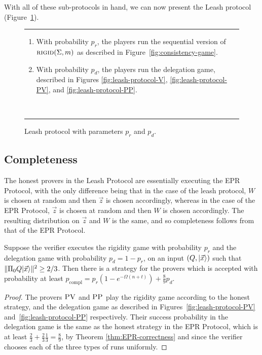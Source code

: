 With all of these sub-protocols in hand, we can now present the Leash protocol (Figure~\ref{fig:leash-description}).
\begin{figure}[H]
\rule[1ex]{\textwidth}{0.5pt}
\vspace{-25pt}
\justify 
\begin{enumerate}
\item With probability $p_r$, the players run the sequential version of $\textsc{rigid}(\Sigma,m)$ as described in Figure~\ref{fig:consistency-game}.
\item With probability $p_d$, the players run the delegation game, described in Figures \ref{fig:leash-protocol-V}, \ref{fig:leash-protocol-PV}, and \ref{fig:leash-protocol-PP}.
\end{enumerate}
~\\
\rule[2ex]{\textwidth}{0.5pt}\vspace{-.5cm}
\caption{Leash protocol with parameters $p_r$ and $p_d$.}
\label{fig:leash-description}
\end{figure} 

\subsection{Completeness}

The honest provers in the Leash Protocol are essentially executing the EPR Protocol, with the only difference being that in the case of the leash protocol, $W$ is chosen at random and then $\vec{z}$ is chosen accordingly, whereas in the case of the EPR Protocol, $\vec{z}$ is chosen at random and then $W$ is chosen accordingly. The resulting distribution on $\vec{z}$ and $W$ is the same, and so completeness follows from that of the EPR Protocol.

\begin{lemma}\label{lem:leash-completeness}
Suppose the verifier executes the rigidity game with probability $p_r$ and the delegation game with probability $p_d=1-p_r$, on an input $(Q,|\vec{x}\rangle)$ such that $\|\Pi_0 Q |\vec{x}\rangle\|^2 \geq 2/3$. Then there is a strategy for the provers which is accepted with probability at least $p_{\mathrm{compl}} = p_r(1-e^{-\Omega(n+t)}) + \frac{8}{9}p_d$. 
\end{lemma}

\begin{proof}
The provers $\textsc{PV}$ and $\textsc{PP}$ play the rigidity game according to the honest strategy, and the delegation game as described in Figures~\ref{fig:leash-protocol-PV} and~\ref{fig:leash-protocol-PP} respectively. Their success probability in the delegation game is the same as the honest strategy in the EPR Protocol, which is at least $\frac{2}{3}+\frac{2}{3}\frac{1}{3}=\frac{8}{9}$, by Theorem \ref{thm:EPR-correctness} and since the verifier chooses each of the three types of runs uniformly.
\end{proof}

